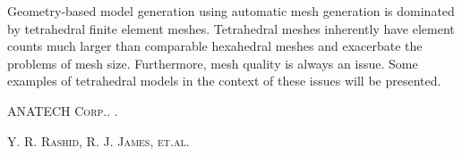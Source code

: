 
Geometry-based model generation using automatic mesh generation is dominated by tetrahedral finite element meshes. Tetrahedral meshes inherently have element counts much larger than comparable hexahedral meshes and exacerbate the problems of mesh size. Furthermore, mesh quality is always an issue. Some examples of tetrahedral models in the context of these issues will be presented.


\begin{thebibliography}{1}
\textsc{ANATECH Corp.}.
.

\textsc{Y. R. Rashid, R. J. James, et.al.}
\end{thebibliography}
